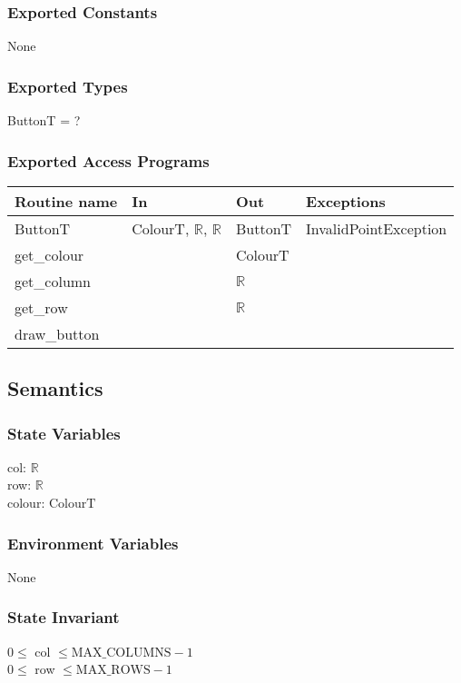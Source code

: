 \documentclass[12pt]{article}
\begin{document}
\subsubsection* {Exported Constants}
None

\subsubsection* {Exported Types}
ButtonT = ?

\subsubsection* {Exported Access Programs}

\begin{tabular}{| l | l | l | l |}
\hline
\textbf{Routine name} & \textbf{In} & \textbf{Out} & \textbf{Exceptions}\\
\hline
ButtonT & ColourT, $\mathbb{R}$, $\mathbb{R}$  & ButtonT & InvalidPointException\\
\hline
get\_colour & & ColourT & \\
\hline
get\_column & & $\mathbb{R}$ & \\
\hline
get\_row & & $\mathbb{R}$ & \\
\hline
draw\_button & & & \\
\hline
\end{tabular}

\subsection* {Semantics}

\subsubsection* {State Variables}

col: $\mathbb{R}$\\
row: $\mathbb{R}$\\
colour: $\text{ColourT}$

\subsubsection* {Environment Variables}
None

\subsubsection* {State Invariant}
$0\leq $ col $\leq \text{MAX\_COLUMNS}-1$\\
$0\leq $ row $\leq \text{MAX\_ROWS}-1$
\end{document}
